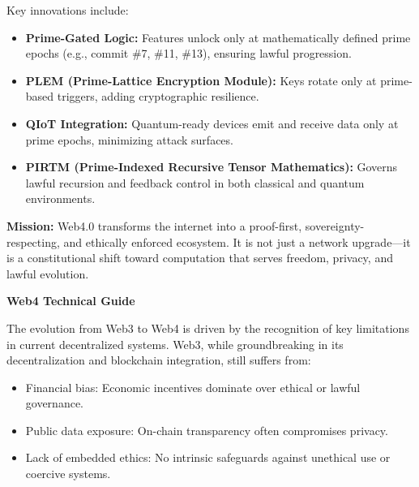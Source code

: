 \documentclass[12]{amsart}
\theoremstyle{plain}
\begin{document}
\begin{titlepage}
\begin{minipage}{0.85\textwidth}
Key innovations include:
\begin{itemize}
    \item \textbf{Prime-Gated Logic:} Features unlock only at mathematically defined prime epochs (e.g., commit \#7, \#11, \#13), ensuring lawful progression.
    \item \textbf{PLEM (Prime-Lattice Encryption Module):} Keys rotate only at prime-based triggers, adding cryptographic resilience.
    \item \textbf{QIoT Integration:} Quantum-ready devices emit and receive data only at prime epochs, minimizing attack surfaces.
    \item \textbf{PIRTM (Prime-Indexed Recursive Tensor Mathematics):} Governs lawful recursion and feedback control in both classical and quantum environments.
\end{itemize}

\textbf{Mission:} Web4.0 transforms the internet into a proof-first, sovereignty-respecting, and ethically enforced ecosystem. It is not just a network upgrade—it is a constitutional shift toward computation that serves freedom, privacy, and lawful evolution.
    \end{minipage}

\end{titlepage}


\clearpage
\clearpage
\thispagestyle{empty}
\begin{center}
    \Large\textbf{Web4 Technical Guide}
\end{center}

\vspace{2em}

The evolution from Web3 to Web4 is driven by the recognition of key limitations in current decentralized systems. 
Web3, while groundbreaking in its decentralization and blockchain integration, still suffers from:
\begin{itemize}
    \item Financial bias: Economic incentives dominate over ethical or lawful governance.
    \item Public data exposure: On-chain transparency often compromises privacy.
    \item Lack of embedded ethics: No intrinsic safeguards against unethical use or coercive systems.
\end{itemize}
\end{document}
